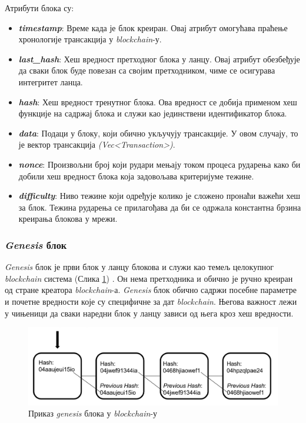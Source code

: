 \documentclass[12pt, a4paper]{article}
\begin{document}
Атрибути блока су:
\begin{itemize}
    \item \textbf{\textit{timestamp}}: Време када је блок креиран. Овај атрибут омогућава праћење хронологије трансакција у \textit{blockchain}-у.
    \item \textbf{\textit{last\_hash}}: Хеш вредност претходног блока у ланцу. Овај атрибут обезбеђује да сваки блок буде повезан са својим претходником, чиме се осигурава интегритет ланца.
    \item \textbf{\textit{hash}}: Хеш вредност тренутног блока. Ова вредност се добија применом хеш функције на садржај блока и служи као јединствени идентификатор блока.
    \item \textbf{\textit{data}}: Подаци у блоку, који обично укључују трансакције. У овом случају, то је вектор трансакција \textit{(Vec<Transaction>)}.
    \item \textbf{\textit{nonce}}: Произвољни број који рудари мењају током процеса рударења како би добили хеш вредност блока која задовољава критеријуме тежине.
    \item \textbf{\textit{difficulty}}: Ниво тежине који одређује колико је сложено пронаћи важећи хеш за блок. Тежина рударења се прилагођава да би се одржала константна брзина креирања блокова у мрежи.
\end{itemize}



\subsubsection{\textit{Genesis} блок}
\textit{Genesis} блок је први блок у ланцу блокова и служи као темељ целокупног \textit{blockchain} система (Слика \ref{fig:genesis-block}) \cite{8}. Он нема претходника и обично је ручно креиран од стране креатора \textit{blockchain}-а. \textit{Genesis} блок обично садржи посебне параметре и почетне вредности које су специфичне за дат \textit{blockchain}. Његова важност лежи у чињеници да сваки наредни блок у ланцу зависи од њега кроз хеш вредности.

\begin{figure}[h]
    \centering
    \includegraphics[width=1\linewidth]{slike/genesis.png}
    \caption{Приказ \textit{genesis} блока у \textit{blockchain}-у}
    \label{fig:genesis-block}
\end{figure}
\end{document}
